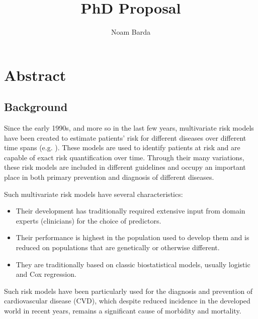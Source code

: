 \documentclass[a4paper,12pt]{article}
\begin{document}
	
	\title{PhD Proposal}
	\author{Noam Barda}
	\maketitle
	
	\tableofcontents
	\newpage
	
	\section{Abstract}
	
		\subsection{Background}
		Since the early 1990s, and more so in the last few years,  multivariate risk models have been created to estimate patients' risk for different diseases over different time spans (e.g. \cite{Wilson1998,Conroy2003,DAgostino2008}). These models are used to identify patients at risk and are capable of exact risk quantification over time\cite{Goff2014}. Through their many variations, these risk models are included in different guidelines and occupy an important place in both primary prevention and diagnosis of different diseases\cite{Graham2007,Goff2014}.
		
		Such multivariate risk models have several characteristics:
		\begin{itemize}
			\item Their development has traditionally required extensive input from domain experts (clinicians) for the choice of predictors.
			\item Their performance is highest in the population used to develop them and is reduced on populations that are genetically or otherwise different\cite{DAgostino2001,Bastuji-Garin2002,DeFilippis2015}.
			\item They are traditionally based on classic biostatistical models, usually logistic and Cox regression.
		\end{itemize}
	
		Such risk models have been particularly used for the diagnosis and prevention of cardiovascular disease (CVD), which despite reduced incidence in the developed world in recent years\cite{Koton2014,Vangen-Loenne2017}, remains a significant cause of morbidity and mortality\cite{ODonnell2016}.
\end{document}
